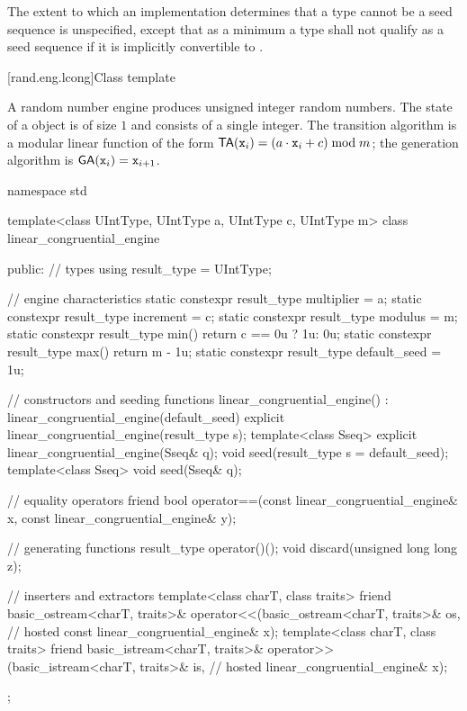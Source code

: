 The extent to which an implementation determines that a type cannot be a seed sequence
is unspecified, except that as a minimum a type shall not qualify as a seed sequence
if it is implicitly convertible to .


[rand.eng.lcong]{Class template }%
%

\pnum
A  random number engine
produces unsigned integer random numbers.
The state 
of a  object 
is of size $1$
and consists of a single integer.
The transition algorithm
is a modular linear function of the form
$\mathsf{TA}(\texttt{\protect x}_{i}) = (a \cdot \texttt{\protect x}_{i} + c) \bmod m$;
the generation algorithm
is $\mathsf{GA}(\texttt{\protect x}_{i}) = \texttt{\protect x}_{i+1}$.

%
%
\begin{codeblock}
namespace std {
  template<class UIntType, UIntType a, UIntType c, UIntType m>
  class linear_congruential_engine {
  public:
    // types
    using result_type = UIntType;

    // engine characteristics
    static constexpr result_type multiplier = a;
    static constexpr result_type increment = c;
    static constexpr result_type modulus = m;
    static constexpr result_type min() { return c == 0u ? 1u: 0u; }
    static constexpr result_type max() { return m - 1u; }
    static constexpr result_type default_seed = 1u;

    // constructors and seeding functions
    linear_congruential_engine() : linear_congruential_engine(default_seed) {}
    explicit linear_congruential_engine(result_type s);
    template<class Sseq> explicit linear_congruential_engine(Sseq& q);
    void seed(result_type s = default_seed);
    template<class Sseq> void seed(Sseq& q);

    // equality operators
    friend bool operator==(const linear_congruential_engine& x,
                           const linear_congruential_engine& y);

    // generating functions
    result_type operator()();
    void discard(unsigned long long z);

    // inserters and extractors
    template<class charT, class traits>
      friend basic_ostream<charT, traits>&
        operator<<(basic_ostream<charT, traits>& os,            // hosted
                   const linear_congruential_engine& x);
    template<class charT, class traits>
      friend basic_istream<charT, traits>&
        operator>>(basic_istream<charT, traits>& is,            // hosted
                   linear_congruential_engine& x);
  };
}
\end{codeblock}

